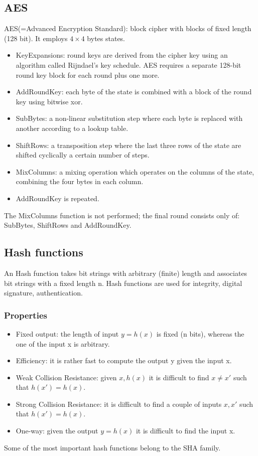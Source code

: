 \documentclass[a4paper, 10pt, titlepage]{article}
\begin{document}
\subsection{AES}
AES(=Advanced Encryption Standard): block cipher with blocks
of fixed length (128 bit). It employs $4 \times 4$ bytes states.
\begin{itemize}
\item KeyExpansions: round keys are derived from the cipher key using an algorithm called Rijndael’s key schedule. AES requires a separate 128-bit round key block for each round plus one more.
\item AddRoundKey: each byte of the state is combined with a block of the round key using bitwise xor.
\item SubBytes: a non-linear substitution step where each byte is
replaced with another according to a lookup table.
\item ShiftRows: a transposition step where the last three rows of the state are shifted cyclically a certain number of steps.
\item MixColumns: a mixing operation which operates on the columns
of the state, combining the four bytes in each column.
\item AddRoundKey is repeated.
\end{itemize}
The MixColumns function is not performed; the final round
consists only of: SubBytes, ShiftRows and AddRoundKey.

\subsection{Hash functions}
An Hash function takes bit strings with arbitrary (finite) length and associates bit strings with a fixed length n. Hash functions are used for integrity, digital signature, authentication.

\subsubsection{Properties}
\begin{itemize}
\item Fixed output: the length of input $y = h(x)$ is fixed (n bits), whereas the one of the input x is arbitrary.
\item Efficiency: it is rather fast to compute the output y given the
input x.
\item Weak Collision Resistance: given $x, h(x)$ it is difficult to find $x \neq x'$ such that $h(x') = h(x)$.
\item Strong Collision Resistance: it is difficult to find a couple of inputs $x, x'$ such that $h(x') = h(x)$.
\item One-way: given the output $y = h(x)$ it is difficult to find the input x.
\end{itemize}
Some of the most important hash functions belong to the SHA family.
\end{document}
